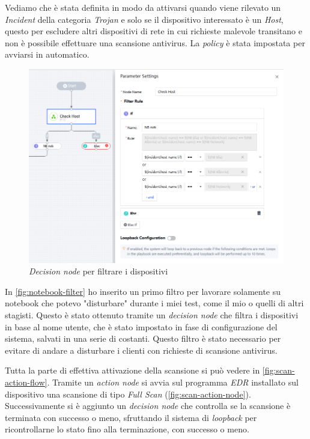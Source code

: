 Vediamo che è stata definita in modo da attivarsi quando viene rilevato un \emph{Incident} della categoria \emph{Trojan} e solo se il dispositivo interessato è un \emph{Host}, questo per escludere altri dispositivi di rete in cui richieste malevole transitano e non è possibile effettuare una scansione antivirus. La \emph{policy} è stata impostata per avviarsi in automatico.

\begin{figure}[!htbp]
    \centering
    \includegraphics[width=0.8\linewidth]{images/ndr/decision-node-notebook.png}
    \caption{\emph{Decision node} per filtrare i dispositivi}
    \label{fig:notebook-filter}
\end{figure}

In \autoref{fig:notebook-filter} ho inserito un primo filtro per lavorare solamente su notebook che potevo "disturbare" durante i miei test, come il mio o quelli di altri stagisti. Questo è stato ottenuto tramite un \emph{decision node} che filtra i dispositivi in base al nome utente, che è stato impostato in fase di configurazione del sistema, salvati in una serie di costanti. Questo filtro è stato necessario per evitare di andare a disturbare i clienti con richieste di scansione antivirus.

Tutta la parte di effettiva attivazione della scansione si può vedere in \autoref{fig:scan-action-flow}. Tramite un \emph{action node} si avvia sul programma \emph{EDR} installato sul dispositivo una scansione di tipo \emph{Full Scan} (\autoref{fig:scan-action-node}). Successivamente si è aggiunto un \emph{decision node} che controlla se la scansione è terminata con successo o meno, sfruttando il sistema di \emph{loopback} per ricontrollarne lo stato fino alla terminazione, con successo o meno.

